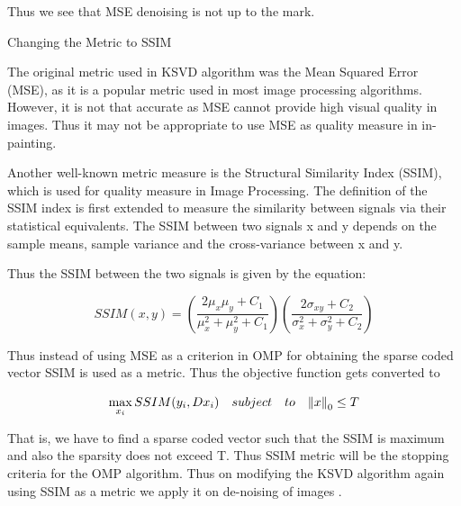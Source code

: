 \documentclass[a4paper, 15pt]{article}
\begin{document}
	\par
	Thus we see that MSE denoising is not up to the mark. 
	\par
	\newpage
	\begin{center}
		{\fontsize{20}{30}\selectfont Changing the Metric to SSIM}\
	\end{center}
	\par
	The original metric used in KSVD algorithm was the Mean Squared Error (MSE), as it is a popular metric used in most image processing algorithms. However, it is not that accurate as MSE cannot provide high visual quality in images. Thus it may not be appropriate to use MSE as quality measure in in-painting. 
	\par
	\par
	Another well-known metric measure is the Structural Similarity Index (SSIM), which is used for quality measure in Image Processing. The definition of the SSIM index is first extended to measure the similarity between signals via their statistical equivalents. The SSIM between two signals x and y depends on the sample means, sample variance and the cross-variance between x and y. 
	\par
	\par
	Thus the SSIM between the two signals is given by the equation: 
	\par
	\begin{equation}
	SSIM(x, y) = \left( \frac{2\mu_{x}\mu_{y} + C_{1}}{\mu^2_{x}+\mu^2_{y} + C_{1}} \right)\left( \frac{2\sigma_{xy} + C_{2}}{\sigma^2_{x} + \sigma^2_{y} + C_{2}}\right)
	\end{equation}
	\par
	Thus instead of using MSE as a criterion in OMP for obtaining the sparse coded vector SSIM is used as a metric. Thus the objective function gets converted to  
	\par
	\begin{equation}
	\max_{x_{i}} SSIM(y_{i}, Dx_{i}) \quad subject \quad to \quad \norm {x}_{0} \leq T
	\end{equation}
	\par
	That is, we have to find a sparse coded vector such that the SSIM is maximum and also the sparsity does not exceed T. Thus SSIM metric will be the stopping criteria for the OMP algorithm. Thus on modifying the KSVD algorithm again using SSIM as a metric we apply it on de-noising of images \cite{3}. 
	\par
	\newpage
\end{document}
